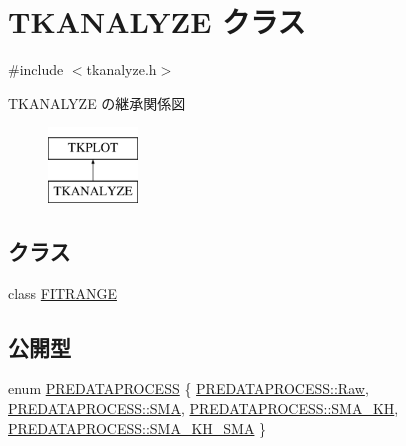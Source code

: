 \hypertarget{class_t_k_a_n_a_l_y_z_e}{}\section{T\+K\+A\+N\+A\+L\+Y\+ZE クラス}
\label{class_t_k_a_n_a_l_y_z_e}


{\ttfamily \#include $<$tkanalyze.\+h$>$}

T\+K\+A\+N\+A\+L\+Y\+ZE の継承関係図\begin{figure}[H]
\begin{center}
\leavevmode
\includegraphics[height=2.000000cm]{class_t_k_a_n_a_l_y_z_e}
\end{center}
\end{figure}
\subsection*{クラス}
\begin{DoxyCompactItemize}
\item 
class \hyperlink{class_t_k_a_n_a_l_y_z_e_1_1_f_i_t_r_a_n_g_e}{F\+I\+T\+R\+A\+N\+GE}
\end{DoxyCompactItemize}
\subsection*{公開型}
\begin{DoxyCompactItemize}
\item 
enum \hyperlink{class_t_k_a_n_a_l_y_z_e_a7a931f59627879ac86be378797e00e1e}{P\+R\+E\+D\+A\+T\+A\+P\+R\+O\+C\+E\+SS} \{ \hyperlink{class_t_k_a_n_a_l_y_z_e_a7a931f59627879ac86be378797e00e1ea65e65c8ab0d8609ce12fc68a03cb8e00}{P\+R\+E\+D\+A\+T\+A\+P\+R\+O\+C\+E\+S\+S\+::\+Raw}, 
\hyperlink{class_t_k_a_n_a_l_y_z_e_a7a931f59627879ac86be378797e00e1ea371bd54577d68567ed50af283052e0d1}{P\+R\+E\+D\+A\+T\+A\+P\+R\+O\+C\+E\+S\+S\+::\+S\+MA}, 
\hyperlink{class_t_k_a_n_a_l_y_z_e_a7a931f59627879ac86be378797e00e1ea6a4b64f73438d12a93beac8948e68c9e}{P\+R\+E\+D\+A\+T\+A\+P\+R\+O\+C\+E\+S\+S\+::\+S\+M\+A\+\_\+\+KH}, 
\hyperlink{class_t_k_a_n_a_l_y_z_e_a7a931f59627879ac86be378797e00e1ea70db69579e6940eec11797004377d147}{P\+R\+E\+D\+A\+T\+A\+P\+R\+O\+C\+E\+S\+S\+::\+S\+M\+A\+\_\+\+K\+H\+\_\+\+S\+MA}
 \}
\end{DoxyCompactItemize}

